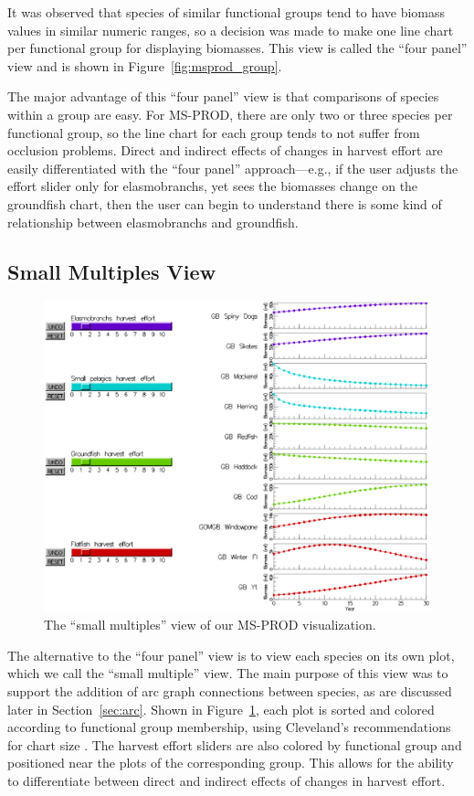 It was observed that species of similar functional groups tend to have biomass values in similar numeric ranges, so a decision was made to make one line chart per functional group for displaying biomasses.  This view is called the ``four panel'' view and is shown in Figure~\ref{fig:msprod_group}.

The major advantage of this ``four panel'' view is that comparisons of species within a group are easy.  For MS-PROD, there are only two or three species per functional group, so the line chart for each group tends to not suffer from occlusion problems.  Direct and indirect effects of changes in harvest effort are easily differentiated with the ``four panel'' approach---e.g., if the user adjusts the effort slider only for elasmobranchs, yet sees the biomasses change on the groundfish chart, then the user can begin to understand there is some kind of relationship between elasmobranchs and groundfish.

\subsection{Small Multiples View}

\begin{figure}[h]
	\centering
	\includegraphics[width=12cm]{figures/eps/msprod_species.eps}
	\caption{The ``small multiples'' view of our MS-PROD visualization.}
	\label{fig:msprod_species}
\end{figure}

The alternative to the ``four panel'' view is to view each species on its own plot, which we call the ``small multiple'' view.  The main purpose of this view was to support the addition of arc graph connections between species, as are discussed later in Section~\ref{sec:arc}. Shown in Figure~\ref{fig:msprod_species}, each plot is sorted and colored according to functional group membership, using Cleveland's recommendations for chart size \cite{cleveland1988}.  The harvest effort sliders are also colored by functional group and positioned near the plots of the corresponding group.  This allows for the ability to differentiate between direct and indirect effects of changes in harvest effort.

